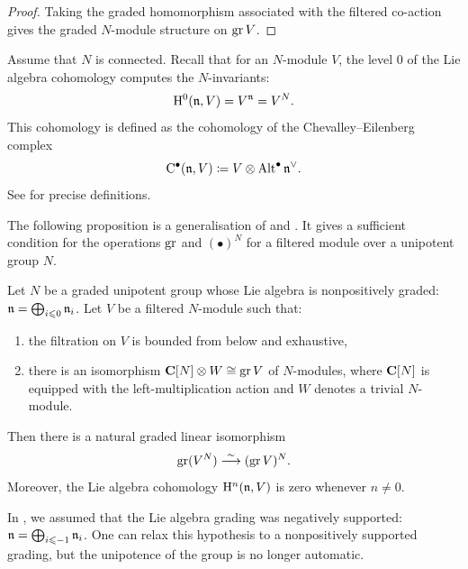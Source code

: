 \begin{proof}
	Taking the graded homomorphism associated with the filtered co-action gives the graded $N$-module structure on $\operatorname{gr} V$. 
\end{proof}

Assume that $N$ is connected. Recall that for an $N$-module $V$, the level $0$ of the Lie algebra cohomology computes the $N$-invariants:
$$ \mathrm{H}^0(\mathfrak n, V) = V^\mathfrak n = V^N. $$
This cohomology is defined as the cohomology of the Chevalley--Eilenberg complex
\[ \mathrm{C}^\bullet(\mathfrak n, V) \coloneq V \otimes \operatorname{Alt}^\bullet \mathfrak n^\vee. \] 
See \cite[Section 7.7]{weibel1994introduction} for precise definitions.

The following proposition is a generalisation of \cite[Proposition 5.2]{gan2002quantization} and \cite[Proposition 4.1.2.5]{juillard2025phd}. It gives a sufficient condition for the operations $\operatorname{gr}$ and $(\bullet)^N$ for a filtered module over a unipotent group $N$.

\begin{proposition} \label{proposition:gr-invariant}
	Let $N$ be a graded unipotent group whose Lie algebra is nonpositively graded: $\mathfrak n = \bigoplus_{i \leqslant 0} \mathfrak n_i$. Let $V$ be a filtered $N$-module such that:
	\begin{enumerate}
		\item the filtration on $V$ is bounded from below and exhaustive,
		
		\item there is an isomorphism $\mathbf{C}[N] \otimes W \cong \operatorname{gr} V$ of $N$-modules, where $\mathbf{C}[N]$ is equipped with the left-multiplication action and $W$ denotes a trivial $N$-module.
	\end{enumerate}
	Then there is a natural graded linear isomorphism 
	$$ \operatorname{gr} (V^N) \overset{\sim}{\longrightarrow} (\operatorname{gr} V)^N. $$
	Moreover, the Lie algebra cohomology $\mathrm{H}^n(\mathfrak n, V)$ is zero whenever $n \neq 0$. 
\end{proposition}

\begin{remark}
	In \cite{juillard2025phd}, we assumed that the Lie algebra grading was negatively supported: $\mathfrak n = \bigoplus_{i \leqslant -1} \mathfrak n_i$. One can relax this hypothesis to a nonpositively supported grading, but the unipotence of the group is no longer automatic.
\end{remark}

